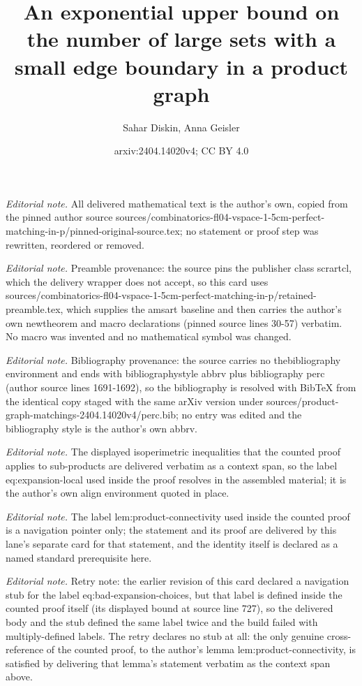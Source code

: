 \documentclass[10pt,a4paper]{amsart}
\title{An exponential upper bound on the number of large sets with a small edge boundary in a product graph}
\author{Sahar Diskin, Anna Geisler}
\date{arxiv:2404.14020v4; CC BY 4.0}
\begin{document}
\maketitle
\noindent\textit{Editorial note.} All delivered mathematical text is the author's own, copied from the pinned author source sources/combinatorics-fl04-vspace-1-5cm-perfect-matching-in-p/pinned-original-source.tex; no statement or proof step was rewritten, reordered or removed.\par\medskip
\noindent\textit{Editorial note.} Preamble provenance: the source pins the publisher class scrartcl, which the delivery wrapper does not accept, so this card uses sources/combinatorics-fl04-vspace-1-5cm-perfect-matching-in-p/retained-preamble.tex, which supplies the amsart baseline and then carries the author's own newtheorem and macro declarations (pinned source lines 30-57) verbatim. No macro was invented and no mathematical symbol was changed.\par\medskip
\noindent\textit{Editorial note.} Bibliography provenance: the source carries no thebibliography environment and ends with bibliographystyle abbrv plus bibliography perc (author source lines 1691-1692), so the bibliography is resolved with BibTeX from the identical copy staged with the same arXiv version under sources/product-graph-matchings-2404.14020v4/perc.bib; no entry was edited and the bibliography style is the author's own abbrv.\par\medskip
\noindent\textit{Editorial note.} The displayed isoperimetric inequalities that the counted proof applies to sub-products are delivered verbatim as a context span, so the label eq:expansion-local used inside the proof resolves in the assembled material; it is the author's own align environment quoted in place.\par\medskip
\noindent\textit{Editorial note.} The label lem:product-connectivity used inside the counted proof is a navigation pointer only; the statement and its proof are delivered by this lane's separate card for that statement, and the identity itself is declared as a named standard prerequisite here.\par\medskip
\noindent\textit{Editorial note.} Retry note: the earlier revision of this card declared a navigation stub for the label eq:bad-expansion-choices, but that label is defined inside the counted proof itself (its displayed bound at source line 727), so the delivered body and the stub defined the same label twice and the build failed with multiply-defined labels. The retry declares no stub at all: the only genuine cross-reference of the counted proof, to the author's lemma lem:product-connectivity, is satisfied by delivering that lemma's statement verbatim as the context span above.\par\medskip
\end{document}
